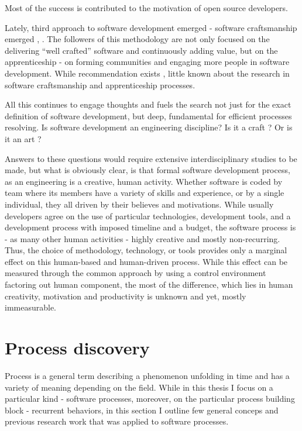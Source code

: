 Most of the success is contributed to the motivation of open source developers.

Lately, third approach to software development emerged - software craftsmanship emerged 
\cite{citeulike:11058561}, \cite{citeulike:11058554}. The followers of this methodology 
are not only focused on the delivering ``well crafted'' software and continuously adding value,
but on the apprenticeship - on forming communities and engaging more people in software development.
While recommendation exists \cite{citeulike:11058784}, little known about the research 
in software craftsmanship and apprenticeship processes.

All this continues to engage thoughts and fuels the search not just for the exact definition 
of software development, but deep, fundamental for efficient processes resolving. 
Is software development an engineering discipline? Is it a craft \cite{citeulike:5203446}? 
Or is it an art \cite{citeulike:11045694}?

Answers to these questions would require extensive interdisciplinary studies to be made, 
but what is obviously clear, is that formal software development process, as an engineering 
is a creative, human activity. 
Whether software is coded 
by team where its members have a variety of skills and experience, or by a single individual,
they all driven by their believes and motivations. While usually developers agree on the use of 
particular technologies, development tools, and a development process with imposed timeline and 
a budget, the software process is - as many other human activities - highly creative and mostly 
non-recurring. Thus, the choice of methodology, technology, or tools provides only a marginal 
effect on this human-based and human-driven process. While this effect can be measured through 
the common approach by using a control environment factoring out human component, the most of 
the difference, which lies in human creativity, motivation and productivity is unknown and yet, 
mostly immeasurable.

\section{Process discovery}\label{process.discovery} 
Process is a general term describing a phenomenon unfolding in time and has a variety of meaning depending
on the field. While in this thesis I focus on a particular kind - software processes, moreover, on the particular process 
building block - recurrent behaviors, in this section I outline few general conceps and previous research work that 
was applied to software processes.

